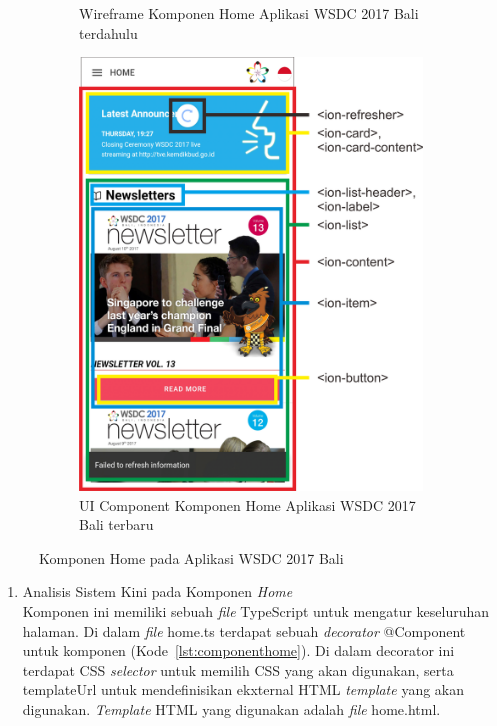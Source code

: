 \begin{enumerate}
\begin{figure}[H]
\begin{subfigure}[b]{0.43\textwidth}
         	\caption{Wireframe Komponen Home Aplikasi WSDC 2017 Bali terdahulu}
         	\label{fig:homePageWireframe}
     	\end{subfigure}
     	\hspace*{0.5in}
     	\begin{subfigure}[b]{0.43\textwidth}
         	\centering
         	\includegraphics[scale=0.4]{Gambar/HomePageKini.png}
         	\caption{UI Component Komponen Home Aplikasi WSDC 2017 Bali terbaru}
         	\label{fig:HomePageKini}
     	\end{subfigure}
        \caption{Komponen Home pada Aplikasi WSDC 2017 Bali}
        \label{fig:UIComponent1}
	\end{figure}
	\begin{enumerate}
		\item Analisis Sistem Kini pada Komponen \textit{Home} \\
		Komponen ini memiliki sebuah \textit{file} TypeScript untuk mengatur keseluruhan halaman. Di dalam \textit{file} home.ts terdapat sebuah \textit{decorator} @Component untuk komponen (Kode~\ref{lst:componenthome}). Di dalam decorator ini terdapat CSS \textit{selector} untuk memilih CSS yang akan digunakan, serta templateUrl untuk mendefinisikan ekxternal HTML \textit{template} yang akan digunakan. \textit{Template} HTML yang digunakan adalah \textit{file} home.html.


\end{enumerate}
\end{enumerate}
